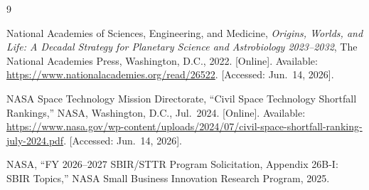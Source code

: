\documentclass[11pt]{article}
\begin{document}
\newpage

\begin{thebibliography}{9}

National Academies of Sciences, Engineering, and Medicine,
\textit{Origins, Worlds, and Life: A Decadal Strategy for Planetary Science and Astrobiology 2023--2032},
The National Academies Press, Washington, D.C., 2022.
[Online]. Available: \url{https://www.nationalacademies.org/read/26522}.
[Accessed: Jun.\ 14, 2026].

NASA Space Technology Mission Directorate,
``Civil Space Technology Shortfall Rankings,''
NASA, Washington, D.C., Jul.\ 2024.
[Online]. Available: \url{https://www.nasa.gov/wp-content/uploads/2024/07/civil-space-shortfall-ranking-july-2024.pdf}.
[Accessed: Jun.\ 14, 2026].

NASA,
``FY 2026--2027 SBIR/STTR Program Solicitation, Appendix 26B-I: SBIR Topics,''
NASA Small Business Innovation Research Program, 2025.

\end{thebibliography}
\end{document}
